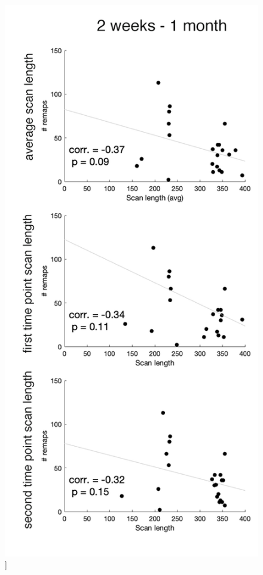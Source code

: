 \documentclass[phd,tocprelim]{cornell}
\renewcommand{\caption}[1]{\singlespacing\hangcaption{#1}\normalspacing}
\begin{document}
\null
\vfill
\clearpage
\null
\vfill
\begin{figure}[h!]
		\ContinuedFloat
		\captionsetup{labelformat=adja-page}
    \centering
    \includegraphics[width=\textwidth]{chapter1/SupplementaryFigure4B.png}
    \caption[]{}
\end{figure}
\null
\vfill
\clearpage
\end{document}
